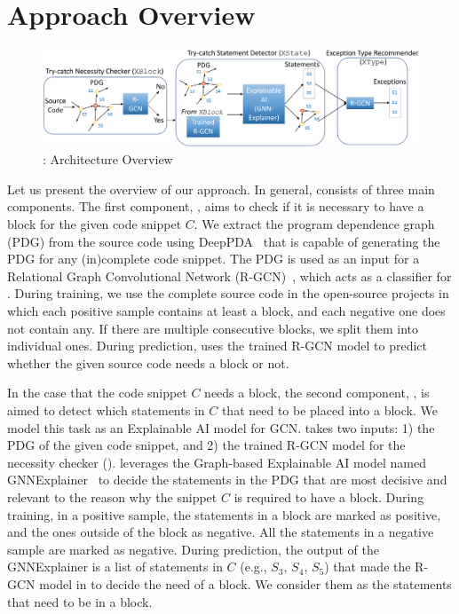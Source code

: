 \section{Approach Overview}
\label{sec:overview}


\begin{figure}[t]
\begin{center}
\includegraphics[width=5.4in]{overview.png}
\vspace{-10pt}
\caption{{\tool}: Architecture Overview}
\label{overview}
\end{center}
\end{figure}



Let us present the overview of our approach. In general, {\tool}
consists of three main components. The first component, {\xblock},
aims to check if it is necessary to have a  block for
the given code snippet $C$. We extract the program dependence graph
(PDG) from the source code using DeepPDA~\cite{icse23} that is capable
of generating the PDG for any (in)complete code snippet. The PDG is
used as an input for a Relational Graph Convolutional Network
(R-GCN)~\cite{yi}, which acts as a classifier for {\xblock}. During
training, we use the complete source code in the open-source projects
in which each positive sample contains at least a 
block, and each negative one does not contain any. If there are
multiple consecutive blocks, we split them into individual
ones. During prediction, {\xblock} uses the trained R-GCN model to predict
whether the given source code needs a  block or not.

In the case that the code snippet $C$ needs a  block,
the second component, {\xstate}, is aimed to detect which statements
in $C$ that need to be placed into a  block.  We model
this task as an Explainable AI model for GCN. {\xstate} takes two
inputs: 1) the PDG of the given code snippet, and 2) the trained R-GCN
model for the  necessity checker
({\xblock}). {\xstate} leverages the Graph-based Explainable AI model
named GNNExplainer~\cite{GNNExplainer} to decide the statements in the
PDG that are most decisive and relevant to the reason why the snippet
$C$ is required to have a  block. During training, in
a positive sample, the statements in a  block are
marked as positive, and the ones outside of the block as negative. All
the statements in a negative sample are marked as negative. During
prediction, the output of the GNNExplainer is a list of statements in
$C$ (e.g., $S_3$, $S_4$, $S_5$) that made the R-GCN model in
{\xblock} to decide the need of a  block. We consider
them as the statements that need to be in a  block.

